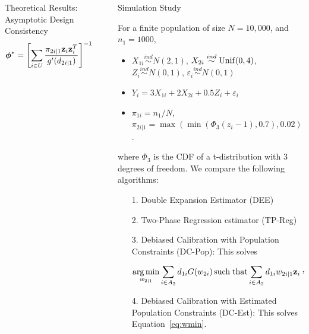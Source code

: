 \documentclass[final]{beamer}
\DeclareMathOperator*{\argmin}{arg\,min}
\DeclareMathOperator*{\suchthat}{such\; that}
\newlength{\sepwidth}
\newlength{\colwidth}
\newcommand{\separatorcolumn}{\begin{column}{\sepwidth}\end{column}}
\begin{document}
\begin{frame}[t]
\begin{columns}[t]
\begin{column}{\colwidth}
\begin{exampleblock}{Theoretical Results: Asymptotic Design Consistency}
    $$
    \bm \phi^* = 
    \left[\sum_{i \in U} \frac{\pi_{2i|1}{\bf z}_i {\bf z}_i^T}{g'(d_{2i|1})}\right]^{-1}
    \sum_{i \in U} \frac{\pi_{2i|1}{\bf z}_i y_i}{g'(d_{2i|1})}.
    $$

    \vspace{-0.5cm}

  \end{exampleblock}

\end{column}

\separatorcolumn

\begin{column}{\colwidth}

  \begin{block}{Simulation Study}

  For a finite population of size $N = 10,000$, and $n_1 = 1000$,

  \begin{itemize}
    \item $X_{1i} \stackrel{ind}{\sim} N(2, 1)$,
      $X_{2i} \stackrel{ind}{\sim} \rm{Unif}(0, 4)$,
      $Z_{i} \stackrel{ind}{\sim} N(0, 1)$,
      $\varepsilon_i \stackrel{ind}{\sim} N(0, 1)$
    \item $Y_{i} = 3 X_{1i} + 2 X_{2i} + 0.5 Z_i + \varepsilon_i$
    \item $\pi_{1i} = n_1 / N$,
      $\pi_{2i|1} = \max(\min(\Phi_3(z_{i} - 1), 0.7), 0.02)$.
  \end{itemize}

  where $\Phi_3$ is the CDF of a t-distribution with 3 degrees of freedom. We
  compare the following algorithms:

  \begin{itemize}
    \item[1.] Double Expansion Estimator (DEE)
    \item[2.] Two-Phase Regression estimator (TP-Reg)
    \item[3.] Debiased Calibration with Population Constraints (DC-Pop): This 
      solves 

    \begin{equation*}
      \argmin_{w_{2|1}} \sum_{i \in A_2} d_{1i} G(w_{2i}) \suchthat
      \sum_{i \in A_2} d_{1i} w_{2i|1} {\bf z}_i = \sum_{i \in U} {\bf z}_i.
    \end{equation*}

    \item[4.] Debiased Calibration with Estimated Population Constraints (DC-Est):
      This solves Equation~\eqref{eq:wmin}.
  \end{itemize}


\end{block}
\end{column}
\end{columns}
\end{frame}
\end{document}
